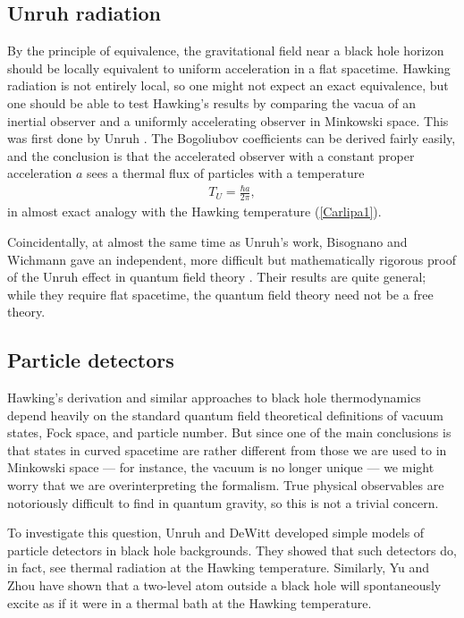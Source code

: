 \documentclass[12pt]{article}
\begin{document}
\subsection{Unruh radiation \label{Unruha}}

By the principle of equivalence, the gravitational field near a black hole
horizon should be locally equivalent to uniform acceleration in a flat
spacetime.  Hawking radiation is not entirely local, so one might not
expect an exact equivalence, but one should be able to test Hawking's
results by comparing the vacua of an inertial observer and a uniformly
accelerating observer in Minkowski space.  This was first done by Unruh
\cite{Unruhc}.  The Bogoliubov coefficients can be derived fairly easily,
and the conclusion is that the accelerated observer with a constant proper 
acceleration $a$ sees a thermal flux of particles with a temperature
\begin{align}
T_U = \frac{\hbar a}{2\pi}  ,
\label{Carlipe1}
\end{align}
in almost exact analogy with the Hawking temperature (\ref{Carlipa1}).

Coincidentally, at almost the same time as Unruh's work, Bisognano 
and Wichmann gave an independent, more difficult but mathematically 
rigorous proof of the Unruh effect in quantum field theory \cite{Bisognano}.
Their results are quite general; while they require flat spacetime,
the quantum field theory need not be a free theory.

\subsection{Particle detectors \label{detecta}}

Hawking's derivation and similar approaches to black hole thermodynamics 
depend heavily on the standard quantum field theoretical definitions of
vacuum states, Fock space, and particle number.  But since one of the 
main conclusions is that states in curved spacetime are rather different 
from those we are used to in Minkowski space --- for instance, the vacuum 
is no longer unique --- we might worry that we are overinterpreting 
the formalism.  True physical observables are notoriously difficult to find
in quantum gravity, so this is not a trivial concern.

To investigate this question, Unruh \cite{Unruhc} and DeWitt \cite{DeWitt}
developed simple models of particle detectors in black hole backgrounds.
They showed that such detectors do, in fact, see thermal radiation at the
Hawking temperature.  Similarly, Yu and Zhou \cite{Yu}  have shown that 
a two-level atom outside a black hole will spontaneously excite as if it
were in a thermal bath at the Hawking temperature.
\end{document}
